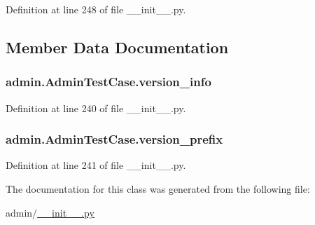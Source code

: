 Definition at line 248 of file \-\_\-\-\_\-init\-\_\-\-\_\-.\-py.



\subsection{Member Data Documentation}
\hypertarget{classadmin_1_1AdminTestCase_a235ad774d40bba3600cf09b79dc9f209}{
\subsubsection[{version\-\_\-info}]{\setlength{\rightskip}{0pt plus 5cm}admin.\-Admin\-Test\-Case.\-version\-\_\-info}}\label{classadmin_1_1AdminTestCase_a235ad774d40bba3600cf09b79dc9f209}


Definition at line 240 of file \-\_\-\-\_\-init\-\_\-\-\_\-.\-py.

\hypertarget{classadmin_1_1AdminTestCase_a6b12aab33be61651698f4b8810678168}{
\subsubsection[{version\-\_\-prefix}]{\setlength{\rightskip}{0pt plus 5cm}admin.\-Admin\-Test\-Case.\-version\-\_\-prefix}}\label{classadmin_1_1AdminTestCase_a6b12aab33be61651698f4b8810678168}


Definition at line 241 of file \-\_\-\-\_\-init\-\_\-\-\_\-.\-py.



The documentation for this class was generated from the following file\-:\begin{DoxyCompactItemize}
\item 
admin/\hyperlink{____init_____8py}{\-\_\-\-\_\-init\-\_\-\-\_\-.\-py}\end{DoxyCompactItemize}
